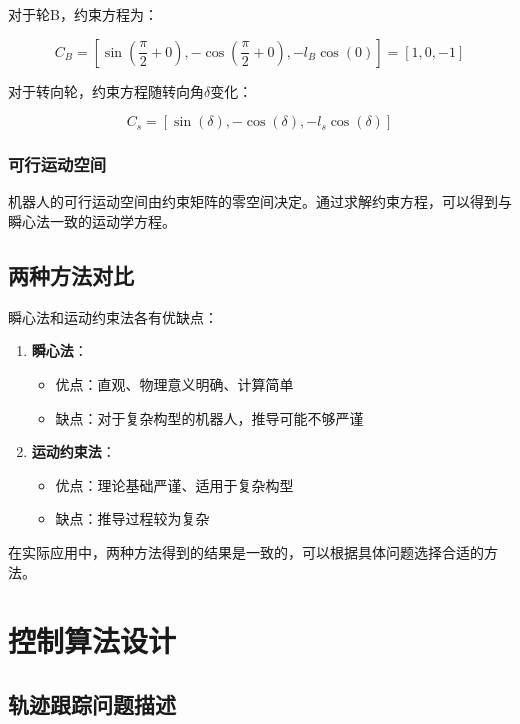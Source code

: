 \documentclass[12pt,a4paper]{report}
\begin{document}
对于轮B，约束方程为：

\begin{equation}
C_B = [\sin(\frac{\pi}{2}+0), -\cos(\frac{\pi}{2}+0), -l_B\cos(0)] = [1, 0, -1]
\end{equation}

对于转向轮，约束方程随转向角$\delta$变化：

\begin{equation}
C_s = [\sin(\delta), -\cos(\delta), -l_s\cos(\delta)]
\end{equation}

\subsection{可行运动空间}

机器人的可行运动空间由约束矩阵的零空间决定。通过求解约束方程，可以得到与瞬心法一致的运动学方程。

\section{两种方法对比}

瞬心法和运动约束法各有优缺点：

\begin{enumerate}[itemsep=0pt]
    \item \textbf{瞬心法}：
    \begin{itemize}[itemsep=0pt]
        \item 优点：直观、物理意义明确、计算简单
        \item 缺点：对于复杂构型的机器人，推导可能不够严谨
    \end{itemize}
    
    \item \textbf{运动约束法}：
    \begin{itemize}[itemsep=0pt]
        \item 优点：理论基础严谨、适用于复杂构型
        \item 缺点：推导过程较为复杂
    \end{itemize}
\end{enumerate}

在实际应用中，两种方法得到的结果是一致的，可以根据具体问题选择合适的方法。

\chapter{控制算法设计}

\section{轨迹跟踪问题描述}
\end{document}
